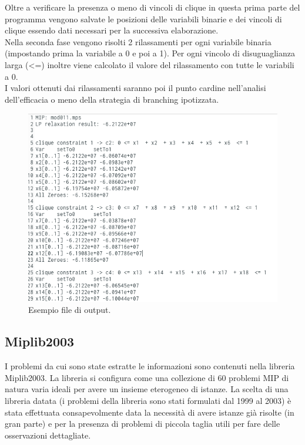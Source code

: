 \documentclass[12pt,a4paper,twoside,openright]{book}
\begin{document}
Oltre a verificare la presenza o meno di vincoli di clique in questa prima parte del programma
vengono salvate le posizioni delle variabili binarie e dei vincoli di clique essendo dati 
necessari per la successiva elaborazione.\\ Nella seconda fase vengono risolti 2 rilassamenti 
per ogni variabile binaria (impostando prima la variabile a 0 e poi a 1). Per ogni vincolo 
di disuguaglianza larga (<=) inoltre viene calcolato il valore del rilassamento con tutte le variabili a 0.\\I valori 
ottenuti dai rilassamenti saranno poi il punto cardine nell'analisi dell'efficacia o meno
della strategia di branching ipotizzata. \\
\begin{figure}[ht]
    \centering
    \includegraphics [scale = 0.5]{output_example.png}
    \caption{Esempio file di output.}
    \label{fig:output}
\end{figure}

\subsection{Miplib2003}
I problemi da cui sono state estratte le informazioni sono contenuti nella libreria Miplib2003.
La libreria si configura come una collezione di 60 problemi MIP di natura varia ideali per avere
un insieme eterogeneo di istanze. La scelta di una libreria datata (i problemi della libreria 
sono stati formulati dal 1999 al 2003) è stata effettuata consapevolmente data la necessità di avere 
istanze già risolte (in gran parte) e per la presenza di problemi di piccola taglia utili per fare 
delle osservazioni dettagliate.
\end{document}
